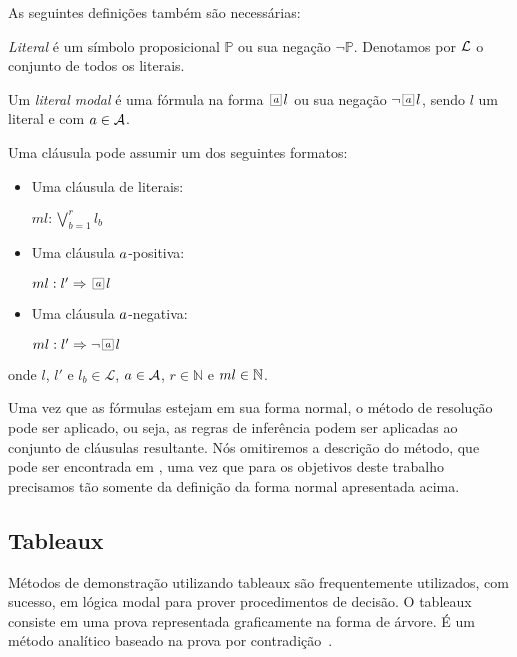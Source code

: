 As seguintes definições também são necessárias:

\begin{definition} \textit{Literal} é um símbolo proposicional $\mathbb{P}$ ou
sua negação $\neg \mathbb{P}$. Denotamos por $\cal{L}$ o conjunto de todos os
literais.  \end{definition}

\begin{definition} Um \textit{literal modal} é uma fórmula na forma
$\nec{\agent} l$ ou sua negação $\neg \nec{\agent} l$, sendo $l$ um literal e
com $a \in {\cal{A}}$.  \end{definition}

Uma cláusula pode assumir um dos seguintes formatos:

\begin{itemize} \item Uma cláusula de literais:

        \begin{center} $ml: \bigvee^r_{b=1} l_b$ \end{center} \item Uma cláusula
                $a$-positiva:

        \begin{center} $ml: l' \Rightarrow \nec{\agent} l$ \end{center} \item
                Uma cláusula $a$-negativa:

        \begin{center} $ml: l' \Rightarrow \neg \nec{\agent} l$ \end{center}
    \end{itemize} onde $l$, $l'$ e $l_b \in \mathcal{L}$, $a \in {\cal{A}}$,
    $r \in \mathbb{N}$ e $ml \in \mbox{$\mathbb N$}$.

Uma vez que as fórmulas estejam em sua forma normal, o método de resolução pode
ser aplicado, ou seja, as regras de inferência podem ser aplicadas ao conjunto
de cláusulas resultante. Nós omitiremos a descrição do método, que pode ser
encontrada em \cite{DBLP:conf/tableaux/NalonHD15}, uma vez que para os objetivos
deste trabalho precisamos tão somente da definição da forma normal apresentada
acima.

\subsection{Tableaux}
\label{sub:tableaux}
Métodos de demonstração utilizando tableaux são frequentemente utilizados, com
sucesso, em lógica modal para prover procedimentos de decisão. O tableaux
consiste em uma prova representada graficamente na forma de árvore. É um método
analítico baseado na prova por contradição~\cite{fit:tableaux}.

